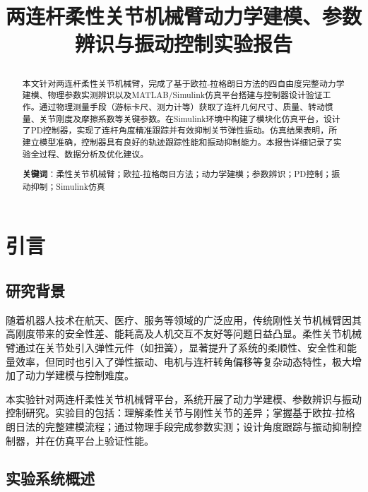 \documentclass[12pt,hyperref,a4paper,UTF8]{ctexart}
\title{
		\vspace{1cm}
		\songti \xiaoerhao \textbf{两连杆柔性关节机械臂动力学建模、参数辨识与振动控制实验报告} \par
		\vspace{1cm}
		\songti \sihao {\textbf{曾康慧（负责仿真平台搭建与控制器设计部分）}} \par
		\vspace{13cm}
	}
\begin{document}
	
	\cover
	\thispagestyle{empty}
	
	\newpage

\begin{abstract}
	本文针对两连杆柔性关节机械臂，完成了基于欧拉-拉格朗日方法的四自由度完整动力学建模、物理参数实测辨识以及MATLAB/Simulink仿真平台搭建与控制器设计验证工作。通过物理测量手段（游标卡尺、测力计等）获取了连杆几何尺寸、质量、转动惯量、关节刚度及摩擦系数等关键参数。在Simulink环境中构建了模块化仿真平台，设计了PD控制器，实现了连杆角度精准跟踪并有效抑制关节弹性振动。仿真结果表明，所建立模型准确，控制器具有良好的轨迹跟踪性能和振动抑制能力。本报告详细记录了实验全过程、数据分析及优化建议。
	
	\textbf{关键词}：柔性关节机械臂；欧拉-拉格朗日方法；动力学建模；参数辨识；PD控制；振动抑制；Simulink仿真
\end{abstract}


	\thispagestyle{empty}
	
	\newpage
	\tableofcontents
	\thispagestyle{empty}
	
	\newpage
	\setcounter{page}{1}



\section{引言}

\subsection{研究背景}
随着机器人技术在航天、医疗、服务等领域的广泛应用，传统刚性关节机械臂因其高刚度带来的安全性差、能耗高及人机交互不友好等问题日益凸显\cite{yan2023disturbance}。柔性关节机械臂通过在关节处引入弹性元件（如扭簧），显著提升了系统的柔顺性、安全性和能量效率，但同时也引入了弹性振动、电机与连杆转角偏移等复杂动态特性，极大增加了动力学建模与控制难度\cite{yan2023pendubot}。

本实验针对两连杆柔性关节机械臂平台，系统开展了动力学建模、参数辨识与振动控制研究。实验目的包括：理解柔性关节与刚性关节的差异；掌握基于欧拉-拉格朗日法的完整建模流程；通过物理手段完成参数实测；设计角度跟踪与振动抑制控制器，并在仿真平台上验证性能。

\subsection{实验系统概述}
\end{document}

